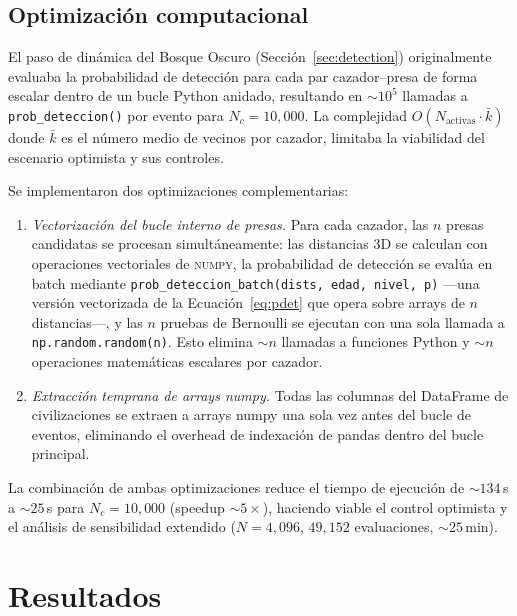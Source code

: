 \documentclass[11pt,a4paper,onecolumn]{article}
\begin{document}
\subsection{Optimización computacional}
\label{sec:optimization}

El paso de dinámica del Bosque Oscuro (Sección~\ref{sec:detection})
originalmente evaluaba la probabilidad de detección para cada par
cazador--presa de forma escalar dentro de un bucle Python anidado,
resultando en $\sim 10^5$ llamadas a \texttt{prob\_deteccion()} por
evento para $N_c = 10{,}000$.
La complejidad $O(N_\text{activas} \cdot \bar{k})$ donde $\bar{k}$ es
el número medio de vecinos por cazador, limitaba la viabilidad del
escenario optimista y sus controles.

Se implementaron dos optimizaciones complementarias:
\begin{enumerate}
  \item \emph{Vectorización del bucle interno de presas.}
        Para cada cazador, las $n$ presas candidatas se procesan
        simultáneamente: las distancias 3D se calculan con operaciones
        vectoriales de \textsc{numpy}, la probabilidad de detección se
        evalúa en batch mediante \texttt{prob\_deteccion\_batch(dists,
        edad, nivel, p)} —una versión vectorizada de la
        Ecuación~\ref{eq:pdet} que opera sobre arrays de $n$ distancias—,
        y las $n$ pruebas de Bernoulli se ejecutan con una sola llamada a
        \texttt{np.random.random(n)}.
        Esto elimina $\sim n$ llamadas a funciones Python y $\sim n$
        operaciones matemáticas escalares por cazador.
  \item \emph{Extracción temprana de arrays numpy.}
        Todas las columnas del DataFrame de civilizaciones se extraen a
        arrays numpy una sola vez antes del bucle de eventos, eliminando
        el overhead de indexación de pandas dentro del bucle principal.
\end{enumerate}
La combinación de ambas optimizaciones reduce el tiempo de ejecución de
$\sim 134$\,s a $\sim 25$\,s para $N_c = 10{,}000$ (speedup $\sim
5\times$), haciendo viable el control optimista y el análisis de
sensibilidad extendido ($N = 4{,}096$, $49{,}152$ evaluaciones,
$\sim 25$\,min).

\section{Resultados}
\label{sec:results}
\end{document}
